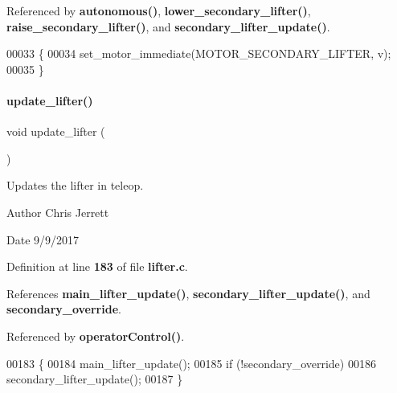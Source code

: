 Referenced by \textbf{ autonomous()}, \textbf{ lower\+\_\+secondary\+\_\+lifter()}, \textbf{ raise\+\_\+secondary\+\_\+lifter()}, and \textbf{ secondary\+\_\+lifter\+\_\+update()}.


\begin{DoxyCode}
00033                                               \{
00034   set_motor_immediate(MOTOR_SECONDARY_LIFTER, v);
00035 \}
\end{DoxyCode}
\mbox{\label{a00026_a59bb7413777ca16aba124aaedf95c79b}} 
\paragraph{update\+\_\+lifter()}
{\footnotesize\ttfamily void update\+\_\+lifter (\begin{DoxyParamCaption}{ }\end{DoxyParamCaption})}



Updates the lifter in teleop. 

\begin{DoxyAuthor}{Author}
Chris Jerrett 
\end{DoxyAuthor}
\begin{DoxyDate}{Date}
9/9/2017 
\end{DoxyDate}


Definition at line \textbf{ 183} of file \textbf{ lifter.\+c}.



References \textbf{ main\+\_\+lifter\+\_\+update()}, \textbf{ secondary\+\_\+lifter\+\_\+update()}, and \textbf{ secondary\+\_\+override}.



Referenced by \textbf{ operator\+Control()}.


\begin{DoxyCode}
00183                      \{
00184   main_lifter_update();
00185   \textcolor{keywordflow}{if} (!secondary_override)
00186     secondary_lifter_update();
00187 \}
\end{DoxyCode}
